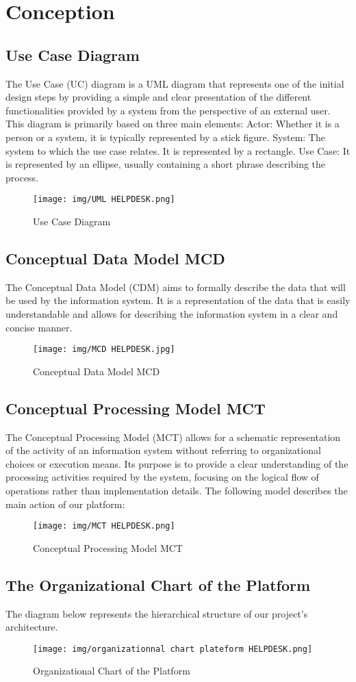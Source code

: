 \section{ Conception }
\subsection{ Use Case Diagram}
The Use Case (UC) diagram is a UML diagram that represents one of the initial design steps by providing a simple and clear presentation of the different functionalities provided by a system from the perspective of an external user. This diagram is primarily based on three main elements:
Actor: Whether it is a person or a system, it is typically represented by a stick figure.
System: The system to which the use case relates. It is represented by a rectangle.
Use Case: It is represented by an ellipse, usually containing a short phrase describing the process.
\begin{figure}[H]
\centering
  \texttt{[image: img/UML HELPDESK.png]}
\caption{Use Case Diagram}
\label{Use Case Diagram}      
\end{figure}
\subsection{Conceptual Data Model MCD}
The Conceptual Data Model (CDM) aims to formally describe the data that will be used by the information system. It is a representation of the data that is easily understandable and allows for describing the information system in a clear and concise manner.
\begin{figure}[H]
\centering
  \texttt{[image: img/MCD HELPDESK.jpg]}
\caption{Conceptual Data Model MCD}
\label{MCD}      
\end{figure}
\subsection{Conceptual Processing Model MCT}
The Conceptual Processing Model (MCT) allows for a schematic representation of the activity of an information system without referring to organizational choices or execution means. Its purpose is to provide a clear understanding of the processing activities required by the system, focusing on the logical flow of operations rather than implementation details. The following model describes the main action of our platform:\\
\begin{figure}[H]
\centering
  \texttt{[image: img/MCT HELPDESK.png]}
\caption{Conceptual Processing Model MCT}
\label{MCT}      
\end{figure}
\subsection{The Organizational Chart of the Platform}
The diagram below represents the hierarchical structure of our project's architecture.
\begin{figure}[H]
\centering
  \texttt{[image: img/organizationnal chart plateform HELPDESK.png]}
\caption{Organizational Chart of the Platform}
\label{Chart of the Platform}      
\end{figure}